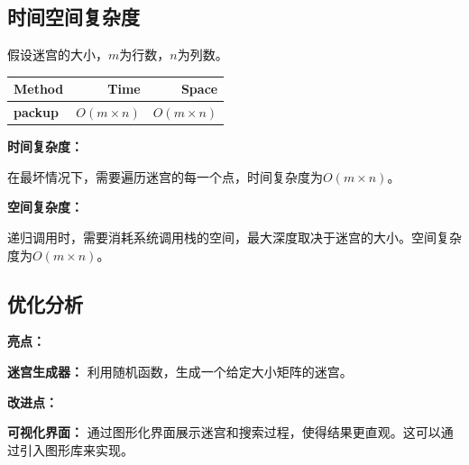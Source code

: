 \documentclass[UTF8]{ctexart}
\begin{document}
\subsection*{时间空间复杂度}

假设迷宫的大小，$m$为行数，$n$为列数。

\begin{center}
    \begin{tabular}{|l|r|r|} \hline
        Method & Time & Space \\\hline
        \textbf{packup} & $O(m \times n)$ & $O(m \times n)$\\ \hline
    \end{tabular}
\end{center}


\textbf{时间复杂度：}

在最坏情况下，需要遍历迷宫的每一个点，时间复杂度为$O(m \times n)$。

\textbf{空间复杂度：}

递归调用时，需要消耗系统调用栈的空间，最大深度取决于迷宫的大小。空间复杂度为$O(m \times n)$。


\subsection*{优化分析}

\textbf{亮点：}

\textbf{迷宫生成器：} 利用随机函数，生成一个给定大小矩阵的迷宫。

\textbf{改进点：}

\textbf{可视化界面：} 通过图形化界面展示迷宫和搜索过程，使得结果更直观。这可以通过引入图形库来实现。

\end{document}
